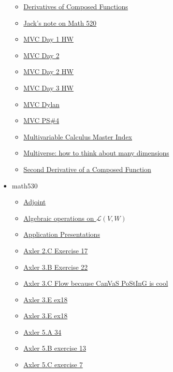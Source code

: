 \documentclass[11pt]{article}
\begin{document}
\begin{itemize}
\begin{itemize}
\item \href{math520/KBrefDerivativesOfComposedFunctions.org}{Derivatives of Composed Functions}
\item \href{math520/KBhMATH520Jack.org}{Jack's note on Math 520}
\item \href{math520/KBdMATH520Day1HW.org}{MVC Day 1 HW}
\item \href{math520/KBdMATH520Day2.org}{MVC Day 2}
\item \href{math520/KBdMATH520Day2HW.org}{MVC Day 2 HW}
\item \href{math520/KBdMATH520Day3HW.org}{MVC Day 3 HW}
\item \href{math520/KBdMATH520Dylan.org}{MVC Dylan}
\item \href{math520/KBdMATH520PS4.org}{MVC PS\#4}
\item \href{math520/KBMATH520MasterIndex.org}{Multivariable Calculus Master Index}
\item \href{math520/KBrefLeonardsMultiDimensionalMultiverse.org}{Multiverse: how to think about many dimensions}
\item \href{math520/KBrefSecondDerivativeOfComposedFunctions.org}{Second Derivative of a Composed Function}
\end{itemize}
\item math530
\begin{itemize}
\item \href{math530/KBrefAdjoints.org}{Adjoint}
\item \href{math530/KBrefLinearMapAlgebra.org}{Algebraic operations on \(\mathcal{L}(V, W)\)}
\item \href{math530/KBe20math530floApplicationPresentations.org}{Application Presentations}
\item \href{math530/KBe20math530retAxler2C17.org}{Axler 2.C Exercise 17}
\item \href{math530/KBe20math530retAxler3B22.org}{Axler 3.B Exercise 22}
\item \href{math530/KBe20math530floAxler3C.org}{Axler 3.C Flow because CanVaS PoStInG is cool}
\item \href{math530/KBe21math530retAxler3E18.org}{Axler 3.E ex18}
\item \href{math530/KBe21math530retAxler3E18old.org}{Axler 3.E ex18}
\item \href{math530/KBe21math530retAxler5A34.org}{Axler 5.A 34}
\item \href{math530/KBe21math530retAxler5B13.org}{Axler 5.B exercise 13}
\item \href{math530/KBe21math530retAxler5C7.org}{Axler 5.C exercise 7}

\end{itemize}
\end{itemize}
\end{document}
